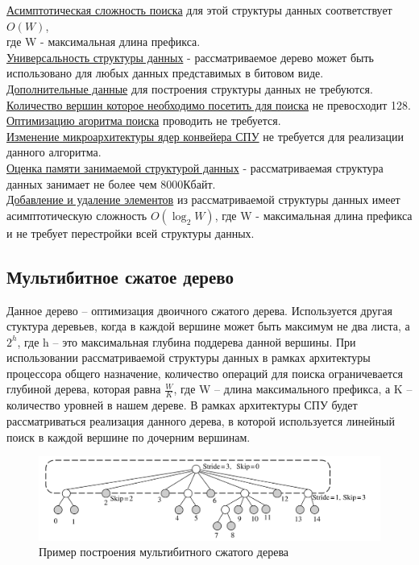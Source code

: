 \documentclass[a4peper, 12pt, titlepage, finall]{report}
\begin{document}
            \underline{Асимптотическая сложность поиска} для этой структуры данных соответствует {\ttfamily $O(W)$},\\
            где {\ttfamily W} - максимальная длина префикса.\\
            \underline{Универсальность структуры данных} - рассматриваемое дерево может быть использовано для любых данных представимых в битовом виде.\\
            \underline{Дополнительные данные} для построения структуры данных не требуются.\\
            \underline{Количество вершин которое необходимо посетить для поиска} не превосходит 128.\\
            \underline{Оптимизацию агоритма поиска} проводить не требуется.\\
            \underline{Изменение микроархитектуры ядер конвейера СПУ} не требуется для реализации данного алгоритма.\\
            \underline{Оценка памяти занимаемой структурой данных} - рассматриваемая структура данных занимает не более чем 8000Кбайт.\\
            \underline{Добавление и удаление элементов} из рассматриваемой структуры данных имеет асимптотическую сложность 
            {\ttfamily $O(\log_2{W})$}, где {\ttfamily W} - максимальная длина префикса и не требует перестройки всей структуры данных.\\
        
        \subsection{Мультибитное сжатое дерево}
            Данное дерево -- оптимизация двоичного сжатого дерева. Используется другая стуктура деревьев, когда в каждой вершине
            может быть максимум не два листа, а {\ttfamily $2^h$}, где {\ttfamily h} -- это максимальная глубина поддерева данной вершины.
            При использовании рассматриваемой структуры данных в рамках архитектуры процессора общего назначение, количество операций для поиска ограничевается глубиной дерева,
            которая равна {\ttfamily $\frac{W}{K}$}, где {\ttfamily W} -- длина максимального префикса, а {\ttfamily K} -- количество уровней в нашем дереве.
            В рамках архитектуры СПУ будет рассматриваться реализация данного дерева, в которой используется линейный поиск в каждой вершине по дочерним вершинам.

            \begin{figure}[h]
                \includegraphics[width=\textwidth]{level_compressed_trie.png}
                \caption{Пример построения мультибитного сжатого дерева}
                \label{fig:mesh3}
            \end{figure}
\end{document}
